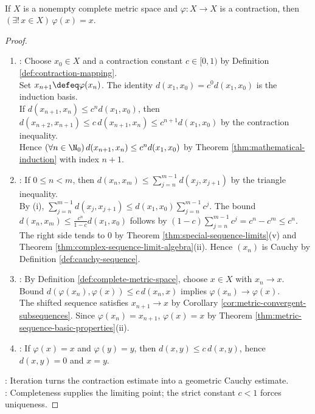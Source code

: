 \begin{theorem} \label{thm:contraction-principle} \\
If $X$ is a nonempty complete metric space and $\varphi:X\to X$ is a contraction, then $(\exists!\,x\in X)\,\varphi(x)=x$.
\begin{proof}
\begin{enumerate}[label=(\roman*)]
\setlength{\itemsep}{0pt}
\item {}: Choose $x_0\in X$ and a contraction constant $c\in[0,1)$ by Definition \ref{def:contraction-mapping}.\\
Set $x_{n+1}\defeq\varphi(x_n)$. The identity $d(x_1,x_0)=c^0d(x_1,x_0)$ is the induction basis.\\
If $d(x_{n+1},x_n)\leq c^nd(x_1,x_0)$, then $d(x_{n+2},x_{n+1})\leq c\,d(x_{n+1},x_n)\leq c^{n+1}d(x_1,x_0)$ by the contraction inequality.\\
Hence $(\forall n\in\N_0)\,d(x_{n+1},x_n)\leq c^nd(x_1,x_0)$ by Theorem \ref{thm:mathematical-induction} with index $n+1$.
\item {}: If $0\leq n<m$, then $d(x_n,x_m)\leq\sum\limits_{j=n}^{m-1}d(x_j,x_{j+1})$ by the triangle inequality.\\
By (i), $\sum\limits_{j=n}^{m-1}d(x_j,x_{j+1})\leq d(x_1,x_0)\sum\limits_{j=n}^{m-1}c^j$. The bound $d(x_n,x_m)\leq\frac{c^n}{1-c}d(x_1,x_0)$ follows by $(1-c)\sum\limits_{j=n}^{m-1}c^j=c^n-c^m\leq c^n$.\\
The right side tends to $0$ by Theorem \ref{thm:special-sequence-limits}(v) and Theorem \ref{thm:complex-sequence-limit-algebra}(ii). Hence $(x_n)$ is Cauchy by Definition \ref{def:cauchy-sequence}.
\item {}: By Definition \ref{def:complete-metric-space}, choose $x\in X$ with $x_n\to x$. Bound $d(\varphi(x_n),\varphi(x))\leq c\,d(x_n,x)$ implies $\varphi(x_n)\to\varphi(x)$.\\
The shifted sequence satisfies $x_{n+1}\to x$ by Corollary \ref{cor:metric-convergent-subsequences}. Since $\varphi(x_n)=x_{n+1}$, $\varphi(x)=x$ by Theorem \ref{thm:metric-sequence-basic-properties}(ii).
\item {}: If $\varphi(x)=x$ and $\varphi(y)=y$, then $d(x,y)\leq c\,d(x,y)$, hence $d(x,y)=0$ and $x=y$.
\end{enumerate}
: Iteration turns the contraction estimate into a geometric Cauchy estimate.\\
: Completeness supplies the limiting point; the strict constant $c<1$ forces uniqueness.
\end{proof}
\end{theorem}

